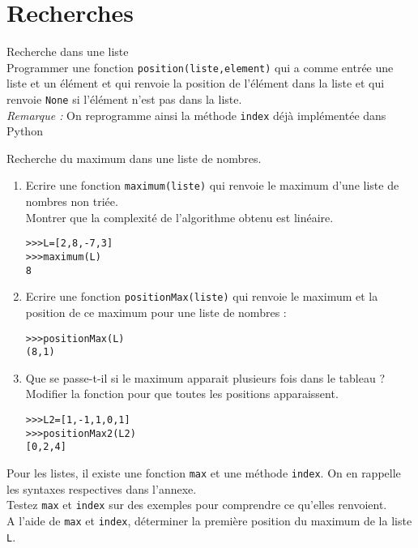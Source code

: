 \section{Recherches}


\begin{exercice}Recherche dans une liste\\
Programmer une fonction \verb?position(liste,element)? qui a comme entr\' ee une liste et un \' el\' ement et qui renvoie la position de l'\' el\' ement dans la liste et qui renvoie \verb?None? si l'\' el\' ement n'est pas dans la liste.\\
\textit{Remarque :} On reprogramme ainsi la m\' ethode \verb?index? d\' ej\` a impl\' ement\' ee dans Python
\end{exercice}


\begin{exercice}Recherche du maximum dans une liste de nombres.
\begin{enumerate}
\item Ecrire une fonction \verb?maximum(liste)? qui renvoie le maximum d'une liste de nombres non tri\' ee.\\
Montrer que la complexit\' e de l'algorithme obtenu est lin\' eaire. 
\begin{verbatim}
>>>L=[2,8,-7,3]
>>>maximum(L)
8
\end{verbatim}
\item Ecrire une fonction \verb?positionMax(liste)? qui renvoie le maximum et la position de ce maximum pour une liste de nombres :
\begin{verbatim}
>>>positionMax(L)
(8,1)
\end{verbatim}
\item Que se passe-t-il si le maximum apparait plusieurs fois dans le tableau ? \\
Modifier la fonction pour que toutes les positions apparaissent. 
\begin{verbatim}
>>>L2=[1,-1,1,0,1]
>>>positionMax2(L2)
[0,2,4]
\end{verbatim}
\end{enumerate}
\end{exercice}

\begin{exercice}
Pour les listes, il existe une fonction \verb?max? et une m\' ethode \verb?index?. On en rappelle les syntaxes respectives dans l'annexe.\\
Testez \verb?max? et \verb?index? sur des exemples pour comprendre ce qu'elles renvoient.\\
A l'aide de \verb?max? et \verb?index?, d\' eterminer la premi\` ere position du maximum de la liste \verb?L?. 
\end{exercice}





